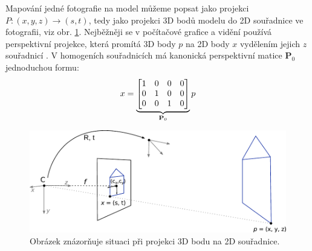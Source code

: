 \documentclass[11pt,twoside,a4paper]{book}
\begin{document}
Mapování jedné fotografie na model můžeme popsat jako projekci $P: (x, y, z) \to (s, t)$, tedy jako projekci 3D bodů modelu do 2D souřadnice ve fotografii, viz obr. \ref{fig:camera-projection}. Nejběžněji se v počítačové grafice a vidění používá perspektivní projekce, která promítá 3D body $p$ na 2D body $x$ vydělením jejich $z$ souřadnicí \cite{Szeliski}. V homogeních souřadnicích má kanonická perspektivní matice \textbf{P}$_0$ jednoduchou formu:
\begin{align}
\label{eq:persp-projection}
x = 
\underbrace{
\begin{bmatrix}
1 & 0 & 0 & 0 \\
0 & 1 & 0 & 0 \\
0 & 0 & 1 & 0 \\
\end{bmatrix}}_\text{\textbf{P}$_0$}
p
\end{align}
\noindent

\begin{figure}[t]
\begin{center}
\includegraphics[width=\textwidth]{figures/camera-projection}
\caption{Obrázek znázorňuje situaci při projekci 3D bodu na 2D souřadnice.}
\label{fig:camera-projection}
\end{center}
\end{figure}
\end{document}
